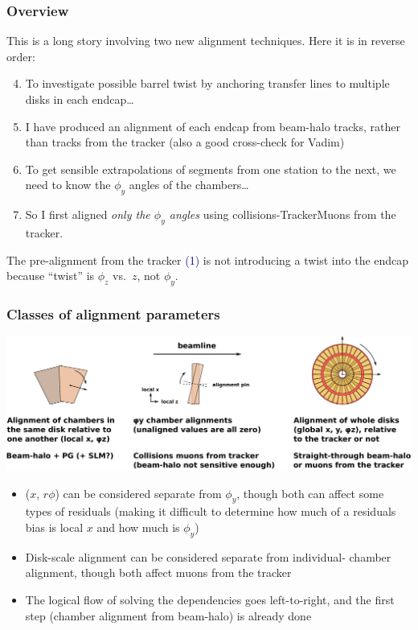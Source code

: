 \documentclass[compress]{beamer}
\begin{document}
\begin{frame}
\frametitle{Overview}
This is a long story involving two new alignment techniques.  Here it
is in reverse order:
\begin{enumerate}
\setcounter{enumi}{3}
\item To investigate possible barrel twist by anchoring transfer lines
  to multiple disks in each endcap\ldots

\setcounter{enumi}{2}
\item I have produced an alignment of each endcap from beam-halo
  tracks, rather than tracks from the tracker (also a good cross-check
  for Vadim)

\setcounter{enumi}{1}
\item To get sensible extrapolations of segments from one station to
  the next, we need to know the $\phi_y$ angles of the chambers\ldots

\setcounter{enumi}{0}
\item So I first aligned {\it only the $\phi_y$ angles} using
  collisions-TrackerMuons from the tracker.
\end{enumerate}

\vfill
The pre-alignment from the tracker \textcolor{darkblue}{(1)} is not introducing a twist into the
endcap because ``twist'' is $\phi_z$ vs.\ $z$, not $\phi_y$.

\vfill
\end{frame}

\begin{frame}
\frametitle{Classes of alignment parameters}

\includegraphics[width=\linewidth]{types_of_alignment.pdf}

\begin{itemize}
\item ($x$, $r\phi$) can be considered separate from $\phi_y$, though
  both can affect some types of residuals (making it difficult to
  determine how much of a residuals bias is local $x$ and how much is $\phi_y$)

\item Disk-scale alignment can be considered separate from
  individual- chamber alignment, though both affect muons from the
  tracker

\item The logical flow of solving the dependencies goes left-to-right,
  and the first step (chamber alignment from beam-halo) is already done
\end{itemize}
\end{frame}
\end{document}
